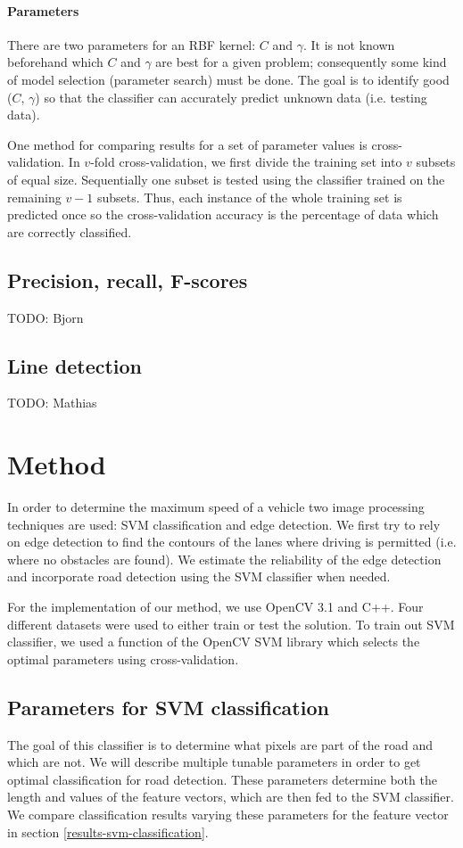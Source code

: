 \documentclass[runningheads,a4paper]{llncs}
\begin{document}
\paragraph{Parameters} There are two parameters for an RBF kernel: $C$ and $\gamma$. It is not known beforehand which $C$ and $\gamma$ are best for a given problem; consequently some kind of model selection (parameter search) must be done. The goal is to identify good ($C$, $\gamma$) so that the classifier can accurately predict unknown data (i.e. testing data).

One method for comparing results for a set of parameter values is cross-validation. In $v$-fold cross-validation, we first divide the training set into $v$ subsets of equal size. Sequentially one subset is tested using the classifier trained on the remaining $v − 1$ subsets. Thus, each instance of the whole training set is predicted once so the cross-validation accuracy is the percentage of data which are correctly classified.

\subsection{Precision, recall, F-scores}

TODO: Bjorn

\subsection{Line detection}
TODO: Mathias


\section{Method}
In order to determine the maximum speed of a vehicle two image processing techniques are used: SVM classification and edge detection. We first try to rely on edge detection to find the contours of the lanes where driving is permitted (i.e. where no obstacles are found). We estimate the reliability of the edge detection and incorporate road detection using the SVM classifier when needed.

For the implementation of our method, we use OpenCV 3.1 \cite{Bradski2000} and C++. Four different datasets were used to either train or test the solution.
To train out SVM classifier, we used a function of the OpenCV SVM library which selects the optimal parameters using cross-validation.

\subsection{Parameters for SVM classification}\label{parameters-classification}
The goal of this classifier is to determine what pixels are part of the road and which are not. We will describe multiple tunable parameters in order to get optimal classification for road detection. These parameters determine both the length and values of the feature vectors, which are then fed to the SVM classifier. We compare classification results varying these parameters for the feature vector in section \ref{results-svm-classification}.
\end{document}
